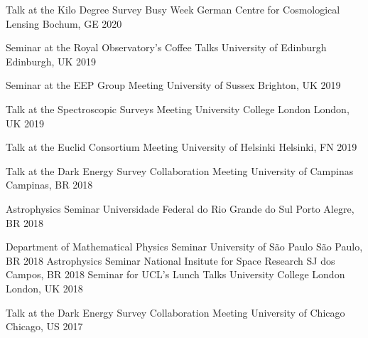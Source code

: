 \begin{cvhonors}
  \cvhonor
    {Talk at the Kilo Degree Survey Busy Week} %
    {German Centre for Cosmological Lensing} %
    {Bochum, GE} %
    {2020} %

  \cvhonor
    {Seminar at the Royal Observatory's Coffee Talks} %
    {University of Edinburgh} %
    {Edinburgh, UK} %
    {2019} %

  \cvhonor
    {Seminar at the EEP Group Meeting} %
    {University of Sussex} %
    {Brighton, UK} %
    {2019} %
    
  \cvhonor
    {Talk at the Spectroscopic Surveys Meeting} %
    {University College London} %
    {London, UK} %
    {2019} %

  \cvhonor
    {Talk at the Euclid Consortium Meeting} %
    {University of Helsinki} %
    {Helsinki, FN} %
    {2019} %

  \cvhonor
    {Talk at the Dark Energy Survey Collaboration Meeting} %
    {University of Campinas} %
    {Campinas, BR} %
    {2018}

  \cvhonor
    {Astrophysics Seminar} %
    {Universidade Federal do Rio Grande do Sul} %
    {Porto Alegre, BR} %
    {2018} %
    
  \cvhonor
    {Department of Mathematical Physics Seminar} %
    {University of São Paulo} %
    {São Paulo, BR} %
    {2018} %
  \cvhonor
    {Astrophysics Seminar} %
    {National Insitute for Space Research} %
    {SJ dos Campos, BR} %
    {2018} %
  \cvhonor
    {Seminar for UCL's Lunch Talks} %
    {University College London} %
    {London, UK} %
    {2018} %


  \cvhonor
    {Talk at the Dark Energy Survey Collaboration Meeting} %
    {University of Chicago} %
    {Chicago, US} %
    {2017} %


\end{cvhonors}
